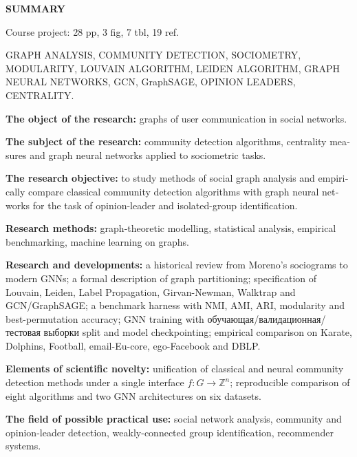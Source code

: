 \documentclass[14pt,a4paper]{extarticle}
\begin{document}
\newpage
\begin{english}
\begin{center}\textbf{SUMMARY}\end{center}
\vspace{6pt}

Course project: 28 pp, 3 fig, 7 tbl, 19 ref.

\medskip
\noindent GRAPH ANALYSIS, COMMUNITY DETECTION, SOCIOMETRY, MODULARITY, LOUVAIN ALGORITHM, LEIDEN ALGORITHM, GRAPH NEURAL NETWORKS, GCN, GraphSAGE, OPINION LEADERS, CENTRALITY.

\medskip
\textbf{The object of the research:} graphs of user communication in social networks.

\textbf{The subject of the research:} community detection algorithms, centrality measures and graph neural networks applied to sociometric tasks.

\textbf{The research objective:} to study methods of social graph analysis and empirically compare classical community detection algorithms with graph neural networks for the task of opinion-leader and isolated-group identification.

\textbf{Research methods:} graph-theoretic modelling, statistical analysis, empirical benchmarking, machine learning on graphs.

\textbf{Research and developments:} a historical review from Moreno's sociograms to modern GNNs; a formal description of graph partitioning; specification of Louvain, Leiden, Label Propagation, Girvan-Newman, Walktrap and GCN/GraphSAGE; a benchmark harness with NMI, AMI, ARI, modularity and best-permutation accuracy; GNN training with обучающая/валидационная/тестовая выборки split and model checkpointing; empirical comparison on Karate, Dolphins, Football, email-Eu-core, ego-Facebook and DBLP.

\textbf{Elements of scientific novelty:} unification of classical and neural community detection methods under a single interface $f \colon G \to \mathbb{Z}^n$; reproducible comparison of eight algorithms and two GNN architectures on six datasets.

\textbf{The field of possible practical use:} social network analysis, community and opinion-leader detection, weakly-connected group identification, recommender systems.
\end{english}
\end{document}

